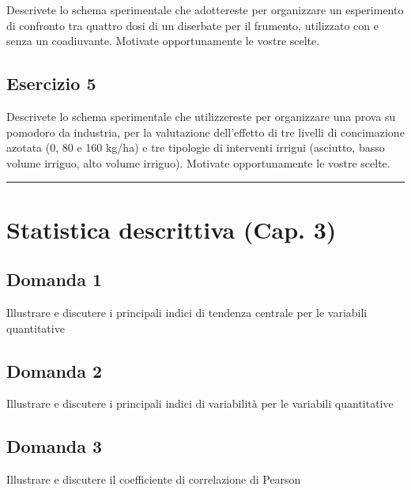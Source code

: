 \documentclass[a4paper,12pt,oneside]{book}
\begin{document}
Descrivete lo schema sperimentale che adottereste per organizzare un esperimento di confronto tra quattro dosi di un diserbate per il frumento, utilizzato con e senza un coadiuvante. Motivate opportunamente le vostre scelte.

\hypertarget{esercizio-5}{%
\subsection{Esercizio 5}\label{esercizio-5}}

Descrivete lo schema sperimentale che utilizzereste per organizzare una prova su pomodoro da industria, per la valutazione dell'effetto di tre livelli di concimazione azotata (0, 80 e 160 kg/ha) e tre tipologie di interventi irrigui (asciutto, basso volume irriguo, alto volume irriguo). Motivate opportunamente le vostre scelte.

\begin{center}\rule{0.5\linewidth}{0.5pt}\end{center}

\hypertarget{statistica-descrittiva-cap.-3}{%
\section{Statistica descrittiva (Cap. 3)}\label{statistica-descrittiva-cap.-3}}

\hypertarget{domanda-1-1}{%
\subsection{Domanda 1}\label{domanda-1-1}}

Illustrare e discutere i principali indici di tendenza centrale per le variabili quantitative

\hypertarget{domanda-2-1}{%
\subsection{Domanda 2}\label{domanda-2-1}}

Illustrare e discutere i principali indici di variabilità per le variabili quantitative

\hypertarget{domanda-3-1}{%
\subsection{Domanda 3}\label{domanda-3-1}}

Illustrare e discutere il coefficiente di correlazione di Pearson
\end{document}

